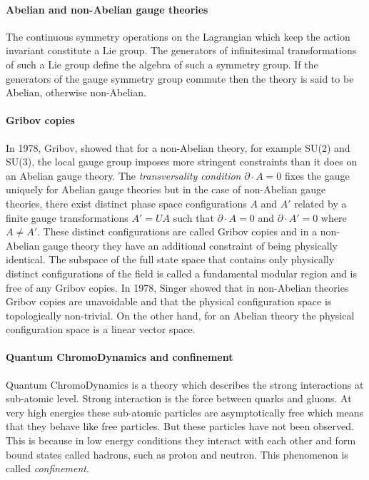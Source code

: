 \paragraph{Abelian and non-Abelian gauge theories}
The continuous symmetry operations on the Lagrangian which keep the
action invariant constitute a Lie group. The generators of infinitesimal
transformations of such a Lie group define the algebra of such a symmetry
group. If the generators of the gauge symmetry group commute then the
theory is said to be Abelian, otherwise non-Abelian.

\paragraph{Gribov copies}
In 1978, Gribov, showed that for a non-Abelian
theory, for example SU(2) and SU(3), the local gauge group imposes more
stringent constraints than it does on an Abelian gauge theory. The
\emph{transversality condition} $ \partial \cdot A=0$ fixes the gauge
uniquely for Abelian gauge theories but in the case of non-Abelian gauge
theories, there exist distinct phase space configurations $A$ and $A'$
related by a finite gauge transformations $A' = U A$ such that
$\partial\cdot A=0$ and $\partial\cdot A'=0$ where $A \neq A'$. These
distinct configurations are called Gribov copies and in a non-Abelian
gauge theory they have an additional constraint of being physically
identical. The subspace of the full state space that contains only
physically distinct configurations of the field is called a fundamental
modular region and is free of any Gribov copies. In 1978,
Singer showed that in non-Abelian theories Gribov copies are
unavoidable and that the physical configuration space is topologically
non-trivial. On the other hand, for an Abelian theory the physical
configuration space is a linear vector space.

\paragraph{Quantum ChromoDynamics and confinement}
Quantum ChromoDynamics is a theory which describes the strong
interactions at sub-atomic level. Strong interaction is the force between
quarks and gluons. At very high energies these sub-atomic particles are
asymptotically free which means that they behave like free particles. But
these particles have not been observed. This is because in low energy
conditions they interact with each other and form bound states called
hadrons, such as proton and neutron. This phenomenon is called
\emph{confinement}.

